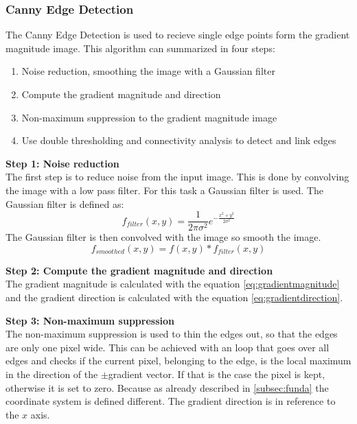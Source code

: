     \subsubsection{Canny Edge Detection} 
    The Canny Edge Detection is used to recieve single edge points form the gradient magnitude image.  
    This algorithm can summarized in four steps\cite{canny_edge}: 
    \begin{enumerate}
        \item Noise reduction, smoothing the image with a Gaussian filter
        \item Compute the gradient magnitude and direction
        \item Non-maximum suppression to the gradient magnitude image
        \item Use double thresholding and connectivity analysis to detect and link edges
    \end{enumerate}
\textbf{Step 1: Noise reduction} \\
The first step is to reduce noise from the input image. This is done by convolving the image with a low pass filter. For this task a Gaussian filter is used. The Gaussian filter is defined as:
\begin{equation}
    f_{filter}(x,y) = \frac{1}{2\pi\sigma^2}e^{-\frac{x^2+y^2}{2\sigma^2}}
\end{equation}
The Gaussian filter is then convolved with the image so smooth the image. 
\begin{equation}
    f_{smoothed}(x,y) = f(x,y) * f_{filter}(x,y)
\end{equation} 

\textbf{Step 2: Compute the gradient magnitude and direction} \\
The gradient magnitude is calculated with the equation \ref{eq:gradientmagnitude} and the gradient direction is calculated with the equation \ref{eq:gradientdirection}.

\textbf{Step 3: Non-maximum suppression} \\
The non-maximum suppression is used to thin the edges out, so that the edges are only one pixel wide. This can be achieved with an loop that goes over all edges and checks if the current pixel, belonging to the edge, is the local maximum in the direction of the $\pm $gradient vector. If that is the case the pixel is kept, otherwise it is set to zero. Because as already described in \ref{subsec:funda} the coordinate system is defined different. The gradient direction is in reference to the $x$ axis. 




